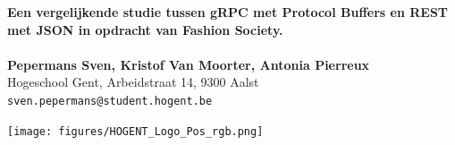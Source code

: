 \documentclass[a0,portrait]{a0poster}
\begin{document}


\begin{minipage}[t]{0.75\linewidth}
\VeryHuge \color{HoGentAccent1} \textbf{Een vergelijkende studie tussen gRPC met Protocol Buffers en REST met JSON in opdracht van Fashion Society.} \color{Black}\\ %
\Huge\textit{}\\[2.4cm] %
\huge \textbf{Pepermans Sven, Kristof Van Moorter, Antonia Pierreux}\\[0.5cm] %
\huge Hogeschool Gent, Arbeidstraat 14, 9300 Aalst\\[0.4cm] %
\Large \texttt{sven.pepermans@student.hogent.be} \\
\end{minipage}
%
\begin{minipage}[t]{0.25\linewidth}
\texttt{[image: figures/HOGENT\_Logo\_Pos\_rgb.png]} 

\end{minipage}

\vspace{1cm} %

\end{document}
